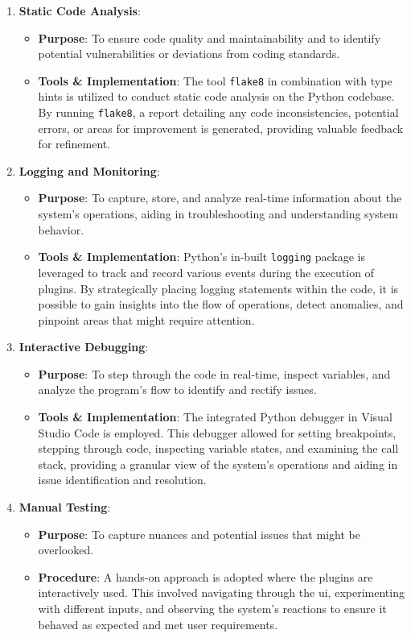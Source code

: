 \documentclass[
  a4paper,  %
  twoside,  %
  bibliography=totoc,
  headsepline,
  cleardoublepage=empty,
  parskip=half,
  draft=false
]{scrbook}
\begin{document}
\begin{enumerate}
    \item \textbf{Static Code Analysis}:
    \begin{itemize}
        \item \textbf{Purpose}: To ensure code quality and maintainability and to identify potential vulnerabilities or deviations from coding standards.
        \item \textbf{Tools \& Implementation}: The tool \texttt{flake8} in combination with type hints is utilized to conduct static code analysis on the Python codebase.
        By running \texttt{flake8}, a report detailing any code inconsistencies, potential errors, or areas for improvement is generated, providing valuable feedback for refinement.
    \end{itemize}

    \item \textbf{Logging and Monitoring}:
    \begin{itemize}
        \item \textbf{Purpose}: To capture, store, and analyze real-time information about the system's operations, aiding in troubleshooting and understanding system behavior.
        \item \textbf{Tools \& Implementation}: Python's in-built \texttt{logging} package is leveraged to track and record various events during the execution of plugins.
        By strategically placing logging statements within the code, it is possible to gain insights into the flow of operations, detect anomalies, and pinpoint areas that might require attention.
    \end{itemize}

    \item \textbf{Interactive Debugging}:
    \begin{itemize}
        \item \textbf{Purpose}: To step through the code in real-time, inspect variables, and analyze the program's flow to identify and rectify issues.
        \item \textbf{Tools \& Implementation}: The integrated Python debugger in Visual Studio Code is employed.
        This debugger allowed for setting breakpoints, stepping through code, inspecting variable states, and examining the call stack, providing a granular view of the system's operations and aiding in issue identification and resolution.
    \end{itemize}

    \item \textbf{Manual Testing}:
    \begin{itemize}
        \item \textbf{Purpose}: To capture nuances and potential issues that might be overlooked.
        \item \textbf{Procedure}: A hands-on approach is adopted where the plugins are interactively used.
        This involved navigating through the \gls{ui}, experimenting with different inputs, and observing the system's reactions to ensure it behaved as expected and met user requirements.
    \end{itemize}
\end{enumerate}
\end{document}
